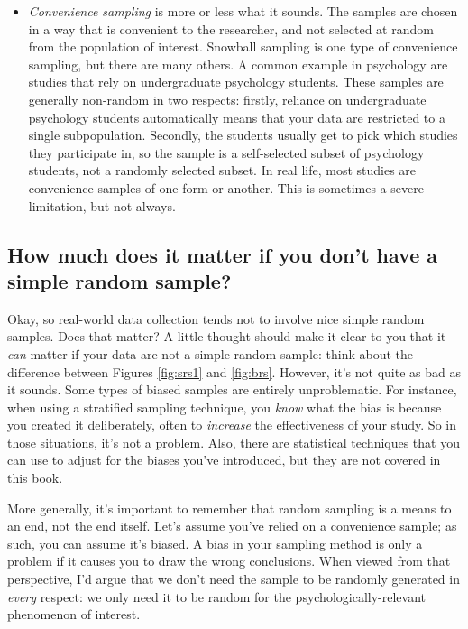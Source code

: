 \documentclass[
]{book}
\theoremstyle{definition}
\theoremstyle{definition}
\theoremstyle{definition}
\theoremstyle{definition}
\theoremstyle{remark}
\begin{document}
\begin{itemize}
\item
  \emph{Convenience sampling} is more or less what it sounds. The samples are chosen in a way that is convenient to the researcher, and not selected at random from the population of interest. Snowball sampling is one type of convenience sampling, but there are many others. A common example in psychology are studies that rely on undergraduate psychology students. These samples are generally non-random in two respects: firstly, reliance on undergraduate psychology students automatically means that your data are restricted to a single subpopulation. Secondly, the students usually get to pick which studies they participate in, so the sample is a self-selected subset of psychology students, not a randomly selected subset. In real life, most studies are convenience samples of one form or another. This is sometimes a severe limitation, but not always.
\end{itemize}

\hypertarget{how-much-does-it-matter-if-you-dont-have-a-simple-random-sample}{%
\subsection{How much does it matter if you don't have a simple random sample?}\label{how-much-does-it-matter-if-you-dont-have-a-simple-random-sample}}

Okay, so real-world data collection tends not to involve nice simple random samples. Does that matter? A little thought should make it clear to you that it \emph{can} matter if your data are not a simple random sample: think about the difference between Figures \ref{fig:srs1} and \ref{fig:brs}. However, it's not quite as bad as it sounds. Some types of biased samples are entirely unproblematic. For instance, when using a stratified sampling technique, you \emph{know} what the bias is because you created it deliberately, often to \emph{increase} the effectiveness of your study. So in those situations, it's not a problem. Also, there are statistical techniques that you can use to adjust for the biases you've introduced, but they are not covered in this book.

More generally, it's important to remember that random sampling is a means to an end, not the end itself. Let's assume you've relied on a convenience sample; as such, you can assume it's biased. A bias in your sampling method is only a problem if it causes you to draw the wrong conclusions. When viewed from that perspective, I'd argue that we don't need the sample to be randomly generated in \emph{every} respect: we only need it to be random for the psychologically-relevant phenomenon of interest.
\end{document}
